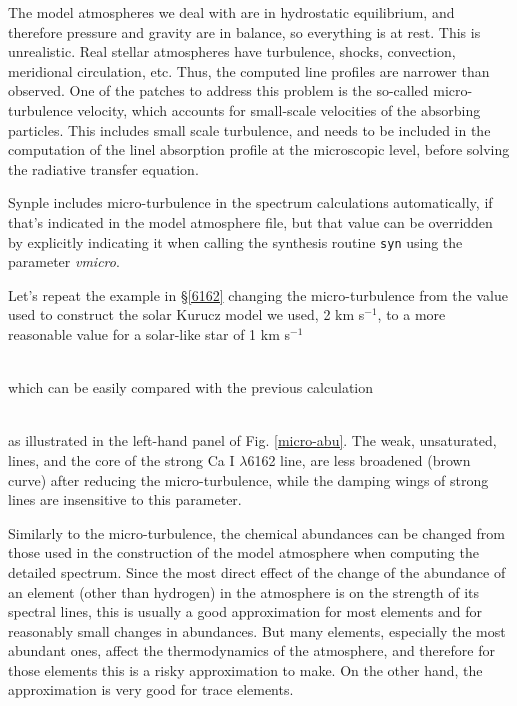 \documentclass[]{article}
\begin{document}
The model atmospheres we deal with are in hydrostatic equilibrium, and therefore pressure and gravity are in balance, so everything is at rest. This is unrealistic. Real stellar atmospheres have turbulence, shocks, convection, meridional circulation, etc. Thus, the computed line profiles are narrower than observed. One of the patches to address this problem is the so-called micro-turbulence velocity, which accounts for small-scale velocities of the absorbing particles. This includes small scale turbulence, and needs to be included in the computation of the linel absorption profile at the microscopic level, before solving the radiative transfer equation.

Synple includes micro-turbulence in the spectrum calculations automatically, if that's indicated in the model atmosphere file, but that value can be overridden by explicitly indicating it when calling the synthesis routine {\tt syn} using the parameter {\it vmicro}.

Let's repeat the example in \S \ref{6162} changing the micro-turbulence from the value used to construct the solar Kurucz model we used, 2 km s$^{-1}$, to a more reasonable value for a solar-like star of 1 km s$^{-1}$
\\
\\

\noindent which can be easily compared with the previous calculation 
\\
\\

\noindent as illustrated in the left-hand panel of Fig. \ref{micro-abu}. The weak, unsaturated, lines, and the core of the strong Ca I $\lambda$6162 line, are less broadened (brown curve) after reducing the micro-turbulence, while the damping wings of strong lines are insensitive to this parameter.

Similarly to the micro-turbulence, the chemical abundances can be changed from those used in the construction of the model atmosphere when computing the detailed spectrum. Since the most direct effect of the change of the abundance of an element (other than hydrogen) in the atmosphere is on the strength of its spectral lines, this is usually a good approximation for most elements and for reasonably small changes in abundances. But many elements, especially the most abundant ones, affect the thermodynamics of the atmosphere, and therefore for those elements this is a risky approximation to make. On the other hand, the approximation is very good for trace elements.
\end{document}
